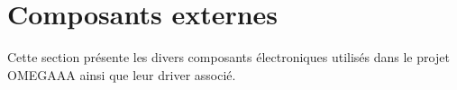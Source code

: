 \section{Composants externes}
\label{sec:drivers}

Cette section présente les divers composants électroniques utilisés dans le projet OMEGAAA
ainsi que leur driver associé.


\newpage

\newpage

\newpage

\newpage
